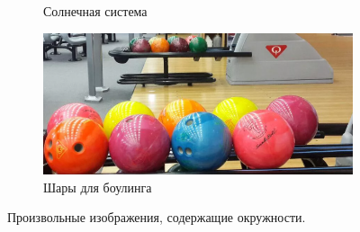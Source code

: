 \documentclass[a4paper, 16pt]{article}
\begin{document}
\begin{figure}[htbp]
\begin{subfigure}{0.3\textwidth}
            \caption{Солнечная система}
            \label{fig:ci2}
        \end{subfigure}
        \hfill
        \begin{subfigure}{0.3\textwidth}
            \centering
            \includegraphics[width=\linewidth]{ci3.png}
            \caption{Шары для боулинга}
            \label{fig:ci3}
        \end{subfigure}
        \caption{Произвольные изображения, содержащие окружности.}
        \label{fig:cis}
    \end{figure}
\end{document}
